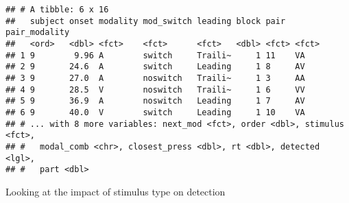 \documentclass[]{article}
\begin{document}
\begin{verbatim}
## # A tibble: 6 x 16
##   subject onset modality mod_switch leading block pair  pair_modality
##   <ord>   <dbl> <fct>    <fct>      <fct>   <dbl> <fct> <fct>        
## 1 9        9.96 A        switch     Traili~     1 11    VA           
## 2 9       24.6  A        switch     Leading     1 8     AV           
## 3 9       27.0  A        noswitch   Traili~     1 3     AA           
## 4 9       28.5  V        noswitch   Traili~     1 6     VV           
## 5 9       36.9  A        noswitch   Leading     1 7     AV           
## 6 9       40.0  V        switch     Leading     1 10    VA           
## # ... with 8 more variables: next_mod <fct>, order <dbl>, stimulus <fct>,
## #   modal_comb <chr>, closest_press <dbl>, rt <dbl>, detected <lgl>,
## #   part <dbl>
\end{verbatim}

Looking at the impact of stimulus type on detection
\end{document}
